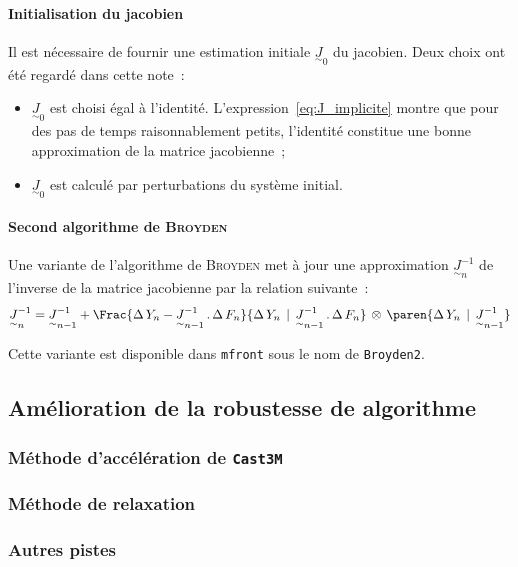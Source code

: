 \documentclass[rectoverso,pleiades,pstricks,leqno,anti]{texmf/note_technique_2010}
\newcommand{\mfront}{\texttt{mfront}}
\newcommand{\castem}{\texttt{Cast3M}}
\begin{document}
\paragraph{Initialisation du jacobien} Il est nécessaire de fournir une
estimation initiale \(\underset{\sim}{J}_{0}\) du jacobien. Deux choix
ont été regardé dans cette note~:
\begin{itemize}
  \item \(\underset{\sim}{J}_{0}\) est choisi égal à l'identité.
  L'expression~\eqref{eq:J_implicite} montre que pour des pas de temps
  raisonnablement petits, l'identité constitue une bonne approximation
  de la matrice jacobienne~;
  \item \(\underset{\sim}{J}_{0}\) est calculé par perturbations du
  système initial.
\end{itemize}

\paragraph{Second algorithme de \textsc{Broyden}}
Une variante de l'algorithme de \textsc{Broyden} met à jour une
approximation \(\underset{\sim}{J}_{n}^{-1}\) de l'inverse de la matrice
jacobienne par la relation suivante~:
\begin{equation}
  \label{eq:Broyden2}
  \underset{\sim}{J}_{n}^{-1} =
  \underset{\sim}{J}_{n-1}^{-1}+\Frac{\Delta\,Y_{n}-\underset{\sim}{J}_{n-1}^{-1}\,.\,\Delta\,F_{n}}{\Delta\,Y_{n}\,\mid\,\underset{\sim}{J}_{n-1}^{-1}\,.\,\Delta\,F_{n}}\,\otimes\,\paren{\Delta\,Y_{n}\,\mid\,\underset{\sim}{J}_{n-1}^{-1}}
\end{equation}
  
Cette variante est disponible dans \mfront{} sous le nom de
\texttt{Broyden2}.

\subsection{Amélioration de la robustesse de algorithme}

\subsubsection{Méthode d'accélération de \castem{}}

\subsubsection{Méthode de relaxation}

\subsubsection{Autres pistes}
\end{document}
